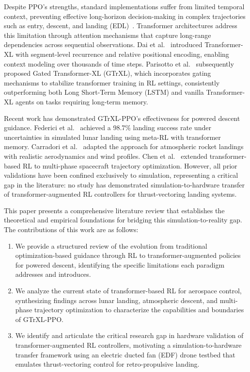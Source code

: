 \documentclass[10pt,twocolumn]{article}
\begin{document}
Despite PPO's strengths, standard implementations suffer from limited temporal context, preventing effective long-horizon decision-making in complex trajectories such as entry, descent, and landing (EDL)~\cite{li2023}.
Transformer architectures address this limitation through attention mechanisms that capture long-range dependencies across sequential observations.
Dai et al.~\cite{dai2019} introduced Transformer-XL with segment-level recurrence and relative positional encoding, enabling context modeling over thousands of time steps.
Parisotto et al.~\cite{parisotto2020} subsequently proposed Gated Transformer-XL (GTrXL), which incorporates gating mechanisms to stabilize transformer training in RL settings, consistently outperforming both Long Short-Term Memory (LSTM) and vanilla Transformer-XL agents on tasks requiring long-term memory.

Recent work has demonstrated GTrXL-PPO's effectiveness for powered descent guidance.
Federici et al.~\cite{federici2024} achieved a 98.7\% landing success rate under uncertainties in simulated lunar landing using meta-RL with transformer memory.
Carradori et al.~\cite{carradori2025} adapted the approach for atmospheric rocket landings with realistic aerodynamics and wind profiles.
Chen et al.~\cite{chen2024} extended transformer-based RL to multi-phase spacecraft trajectory optimization.
However, all prior validations have been confined exclusively to simulation, representing a critical gap in the literature: no study has demonstrated simulation-to-hardware transfer of transformer-augmented RL controllers for thrust-vectoring landing systems.

This paper presents a comprehensive literature review that establishes the theoretical and empirical foundations for bridging this simulation-to-reality gap.
The contributions of this work are as follows:

\begin{enumerate}
    \item We provide a structured review of the evolution from traditional optimization-based guidance through RL to transformer-augmented policies for powered descent, identifying the specific limitations each paradigm addresses and introduces.
    \item We analyze the current state of transformer-based RL for aerospace control, synthesizing findings across lunar landing, atmospheric descent, and multi-phase trajectory optimization to characterize the capabilities and boundaries of GTrXL-PPO.
    \item We identify and articulate the critical research gap in hardware validation of transformer-augmented RL controllers, motivating a simulation-to-hardware transfer framework using an electric ducted fan (EDF) drone testbed that emulates thrust-vectoring control for retro-propulsive landing.
\end{enumerate}
\end{document}
